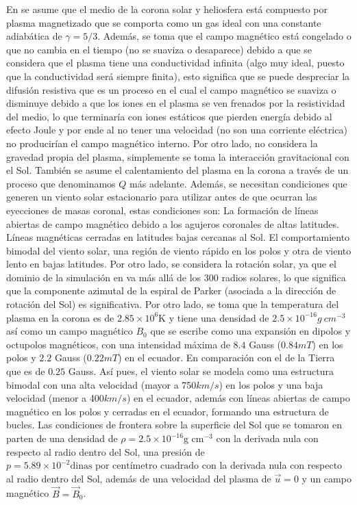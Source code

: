 En \cite{lugaz-2005} se asume que el medio de la corona solar y heliosfera está compuesto por plasma magnetizado que se comporta como un gas ideal con una constante adiabática de $\gamma=5/3$. Además, se toma que el campo magnético está congelado o que no cambia en el tiempo (no se suaviza o desaparece) debido a que se considera que el plasma tiene una conductividad infinita (algo muy ideal, puesto que la conductividad será siempre finita), esto significa que se puede despreciar la difusión resistiva que es un proceso en el cual el campo magnético se suaviza o disminuye debido a que los iones en el plasma se ven frenados por la resistividad del medio, lo que terminaría con iones estáticos que pierden energía debido al efecto Joule y por ende al no tener una velocidad (no son una corriente eléctrica) no producirían el campo magnético interno. Por otro lado, no considera la gravedad propia del plasma, simplemente se toma la interacción gravitacional con el Sol. También se asume el calentamiento del plasma en la corona a través de un proceso que denominamos $Q$ más adelante.
Además, se necesitan condiciones que generen un viento solar estacionario para utilizar antes de que ocurran las eyecciones de masas coronal, estas condiciones son: La formación de líneas abiertas de campo magnético debido a los agujeros coronales de altas latitudes. %
Líneas magnéticas cerradas en latitudes bajas cercanas al Sol. %
El comportamiento bimodal del viento solar, una región de viento rápido en los polos y otra de viento lento en bajas latitudes. 
Por otro lado, se considera la rotación solar, ya que el dominio de la simulación en \cite{lugaz-2005} va más allá de los 300 radios solares, lo que significa que la componente azimutal de la espiral de Parker (asociada a la dirección de rotación del Sol) es significativa. Por otro lado, se toma que la temperatura del plasma en la corona es de $2.85 \times 10^{6}$K y tiene una densidad de $2.5 \times 10^{-16}g~cm^{-3}$ así como un campo magnético $B_0$ que se escribe como una expansión en dipolos y octupolos magnéticos, con una intensidad máxima de $8.4$ Gauss ($0.84mT$) en los polos y $2.2$ Gauss ($0.22mT$) en el ecuador. En comparación con el de la Tierra que es de $0.25$ Gauss. Así pues, el viento solar se modela como una estructura bimodal con una alta velocidad (mayor a 750$km/s$) en los polos y una baja velocidad (menor a 400$km/s$) en el ecuador, además con líneas abiertas de campo magnético en los polos y cerradas en el ecuador, formando una estructura de bucles.
Las condiciones de frontera sobre la superficie del Sol que se tomaron en \cite{lugaz-2005} parten de una densidad de $\rho=2.5\times10^{-16}\text{g cm$^{-3}$}$ con la derivada nula con respecto al radio dentro del Sol, una presión de $p=5.89\times 10^{-2}\text{dinas por centímetro cuadrado}$ con la derivada nula con respecto al radio dentro del Sol, además de una velocidad del plasma de $\vec{u}=0$ y un campo magnético $\vec{B}=\vec{B}_0$.

